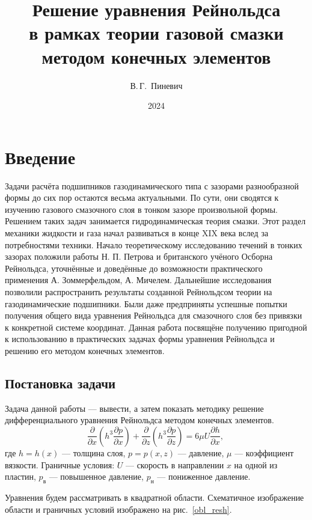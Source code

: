 \documentclass[12pt, a4paper]{article}
\title{Решение уравнения Рейнольдса\\ в рамках теории газовой смазки \\ методом конечных элементов}
\author{В.\,Г.~Пиневич}
\date{2024}
\begin{document}
\maketitle

\tableofcontents



\newpage

\section{Введение}
Задачи расчёта подшипников газодинамического типа с зазорами разнообразной формы до сих пор остаются весьма актуальными. По сути, они сводятся к изучению газового смазочного слоя в тонком зазоре произвольной формы. Решением таких задач занимается гидродинамическая теория смазки. Этот раздел механики жидкости и газа начал развиваться в конце XIX века вслед за потребностями техники. Начало теоретическому исследованию течений в тонких зазорах положили работы Н. П. Петрова и британского учёного Осборна Рейнольдса, уточнённые и доведённые до возможности практического применения А. Зоммерфельдом, А. Мичелем. Дальнейшие исследования позволили распространить результаты созданной Рейнольдсом теории на газодинамические подшипники. Были даже предприняты успешные попытки получения общего вида уравнения Рейнольдса для смазочного слоя без привязки к конкретной системе координат. Данная работа посвящёне получению пригодной к использованию в практических задачах формы уравнения Рейнольдса и решению его методом конечных элементов.


\subsection{Постановка задачи}
Задача данной работы --- вывести, а затем показать методику решение дифференциального уравнения Рейнольдса методом конечных элементов.
\begin{equation}
	\label{reinolts-task}
\frac{\partial}{\partial x} \left(h^3 \frac{\partial p}{\partial x} \right) + \frac{\partial}{\partial z} \left(h^3 \frac{\partial p}{\partial z} \right) = 6 \mu U \frac{\partial h}{\partial x} \text{, }
\end{equation}
где $h = h(x)$ --- толщина слоя, $p = p(x, z)$ --- давление, $\mu$ --- коэффициент вязкости. Граничные условия: $U$ --- скорость в направлении $x$ на одной из пластин, $p_{\text{в}}$ --- повышенное давление, $p_{\text{н}}$ --- пониженное давление. 

Уравнения будем рассматривать в квадратной области. Схематичное изображение области и граничных условий изображено на рис.~\ref{obl_resh}.
\end{document}
